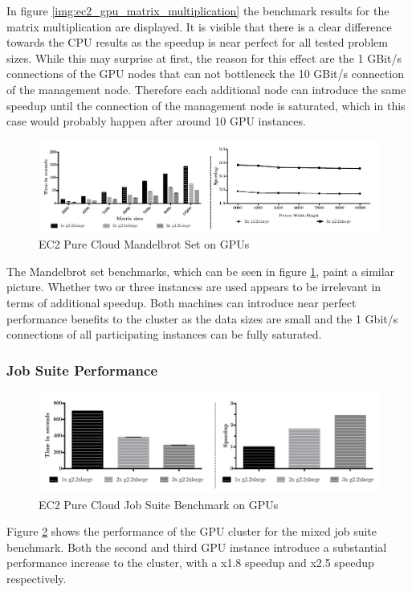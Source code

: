 In figure \ref{img:ec2_gpu_matrix_multiplication} the benchmark results for the matrix multiplication are displayed. It is visible that there is a clear difference towards the CPU results as the speedup is near perfect for all tested problem sizes. While this may surprise at first, the reason for this effect are the 1 GBit/s connections of the GPU nodes that can not bottleneck the 10 GBit/s connection of the management node. Therefore each additional node can introduce the same speedup until the connection of the management node is saturated, which in this case would probably happen after around 10 GPU instances.

\begin{figure}[H]
	\includegraphics[width=1.0\textwidth]{images/ec2_gpu_mandelbrot.pdf}
	\centering
	\caption{EC2 Pure Cloud Mandelbrot Set on GPUs}
	\label{img:ec2_gpu_mandelbrot}
\end{figure}

The Mandelbrot set benchmarks, which can be seen in figure \ref{img:ec2_gpu_mandelbrot}, paint a similar picture. Whether two or three instances are used appears to be irrelevant in terms of additional speedup. Both machines can introduce near perfect performance benefits to the cluster as the data sizes are small and the 1 Gbit/s connections of all participating instances can be fully saturated.

\subsubsection*{Job Suite Performance}

\begin{figure}[H]
	\includegraphics[width=1.0\textwidth]{images/ec2_gpu_full_benchmark.pdf}
	\centering
	\caption{EC2 Pure Cloud Job Suite Benchmark on GPUs}
	\label{img:ec2_gpu_full_benchmark}
\end{figure}

Figure \ref{img:ec2_gpu_full_benchmark} shows the performance of the GPU cluster for the mixed job suite benchmark. Both the second and third GPU instance introduce a substantial performance increase to the cluster, with a x1.8 speedup and x2.5 speedup respectively.

